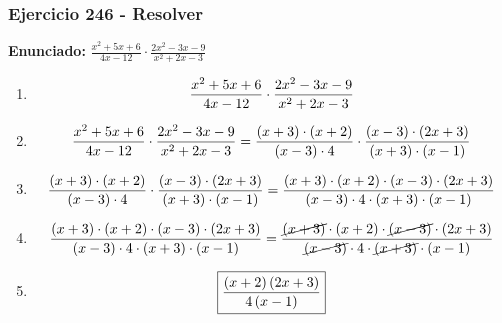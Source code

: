 \documentclass[11pt,a4paper]{article}
\newcommand{\fitmath}[1]{%
\[
\setbox0=\hbox{$\displaystyle #1$}%
\ifdim\wd0>\linewidth
\resizebox{\linewidth}{!}{$\displaystyle #1$}%
\else
#1%
\fi
\]
}
\begin{document}
\subsubsection*{Ejercicio 246 - Resolver}
\textbf{Enunciado:} $ \frac{x^{2} + 5 x + 6}{4 x - 12} \cdot \frac{2 x^{2} - 3 x - 9}{x^{2} + 2 x - 3} $\par
\begin{enumerate}[leftmargin=2em]
\item \fitmath{\frac{x^{2} + 5 x + 6}{4 x - 12} \cdot \frac{2 x^{2} - 3 x - 9}{x^{2} + 2 x - 3}}
\item \fitmath{\frac{x^{2} + 5 x + 6}{4 x - 12} \cdot \frac{2 x^{2} - 3 x - 9}{x^{2} + 2 x - 3}= \frac{\left(x + 3\right)\cdot \left(x + 2\right)}{\left(x - 3\right)\cdot 4} \cdot \frac{\left(x - 3\right)\cdot \left(2 x + 3\right)}{\left(x + 3\right)\cdot \left(x - 1\right)}}
\item \fitmath{\frac{\left(x + 3\right)\cdot \left(x + 2\right)}{\left(x - 3\right)\cdot 4}\cdot \frac{\left(x - 3\right)\cdot \left(2 x + 3\right)}{\left(x + 3\right)\cdot \left(x - 1\right)}= \frac{\left(x + 3\right)\cdot \left(x + 2\right)\cdot \left(x - 3\right)\cdot \left(2 x + 3\right)}{\left(x - 3\right)\cdot 4\cdot \left(x + 3\right)\cdot \left(x - 1\right)}}
\item \fitmath{\frac{\left(x + 3\right)\cdot \left(x + 2\right)\cdot \left(x - 3\right)\cdot \left(2 x + 3\right)}{\left(x - 3\right)\cdot 4\cdot \left(x + 3\right)\cdot \left(x - 1\right)}= \frac{\cancel{\left(x + 3\right)}\cdot \left(x + 2\right)\cdot \cancel{\left(x - 3\right)}\cdot \left(2 x + 3\right)}{\cancel{\left(x - 3\right)}\cdot 4\cdot \cancel{\left(x + 3\right)}\cdot \left(x - 1\right)}}
\item \fitmath{\boxed{\frac{\left(x + 2\right) \left(2 x + 3\right)}{4 \left(x - 1\right)}}}
\end{enumerate}

\vspace{0.12cm}
\end{document}
